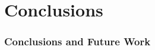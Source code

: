 \documentclass[t,handout, 10pt]{beamer}
\begin{document}
\section{Conclusions}

\begin{frame}
\frametitle{Conclusions and Future Work}
\end{frame}
\end{document}
